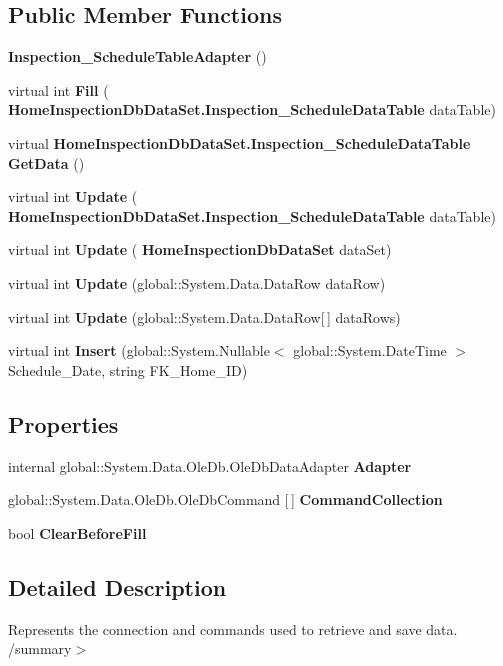 \subsection*{Public Member Functions}
\begin{DoxyCompactItemize}
\item 
\textbf{ Inspection\+\_\+\+Schedule\+Table\+Adapter} ()
\item 
virtual int \textbf{ Fill} (\textbf{ Home\+Inspection\+Db\+Data\+Set.\+Inspection\+\_\+\+Schedule\+Data\+Table} data\+Table)
\item 
virtual \textbf{ Home\+Inspection\+Db\+Data\+Set.\+Inspection\+\_\+\+Schedule\+Data\+Table} \textbf{ Get\+Data} ()
\item 
virtual int \textbf{ Update} (\textbf{ Home\+Inspection\+Db\+Data\+Set.\+Inspection\+\_\+\+Schedule\+Data\+Table} data\+Table)
\item 
virtual int \textbf{ Update} (\textbf{ Home\+Inspection\+Db\+Data\+Set} data\+Set)
\item 
virtual int \textbf{ Update} (global\+::\+System.\+Data.\+Data\+Row data\+Row)
\item 
virtual int \textbf{ Update} (global\+::\+System.\+Data.\+Data\+Row[$\,$] data\+Rows)
\item 
virtual int \textbf{ Insert} (global\+::\+System.\+Nullable$<$ global\+::\+System.\+Date\+Time $>$ Schedule\+\_\+\+Date, string F\+K\+\_\+\+Home\+\_\+\+ID)
\end{DoxyCompactItemize}
\subsection*{Properties}
\begin{DoxyCompactItemize}
\item 
internal global\+::\+System.\+Data.\+Ole\+Db.\+Ole\+Db\+Data\+Adapter \textbf{ Adapter}\hspace{0.3cm}{\ttfamily  [get]}
\item 
global\+::\+System.\+Data.\+Ole\+Db.\+Ole\+Db\+Command [$\,$] \textbf{ Command\+Collection}\hspace{0.3cm}{\ttfamily  [get]}
\item 
bool \textbf{ Clear\+Before\+Fill}\hspace{0.3cm}{\ttfamily  [get, set]}
\end{DoxyCompactItemize}


\subsection{Detailed Description}
Represents the connection and commands used to retrieve and save data. /summary$>$ 

